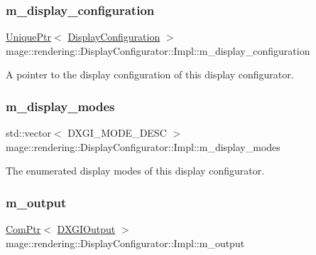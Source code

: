 \subsubsection{\texorpdfstring{m\+\_\+display\+\_\+configuration}{m\_display\_configuration}}
{\footnotesize\ttfamily \mbox{\hyperlink{namespacemage_a3316d7143a973e37adf1110f2e80ca31}{Unique\+Ptr}}$<$ \mbox{\hyperlink{classmage_1_1rendering_1_1_display_configuration}{Display\+Configuration}} $>$ mage\+::rendering\+::\+Display\+Configurator\+::\+Impl\+::m\+\_\+display\+\_\+configuration\hspace{0.3cm}{\ttfamily [private]}}

A pointer to the display configuration of this display configurator. \mbox{\label{classmage_1_1rendering_1_1_display_configurator_1_1_impl_ae04d4e1430c684cb0961f838d040f6e1}} 
\subsubsection{\texorpdfstring{m\+\_\+display\+\_\+modes}{m\_display\_modes}}
{\footnotesize\ttfamily std\+::vector$<$ D\+X\+G\+I\+\_\+\+M\+O\+D\+E\+\_\+\+D\+E\+SC $>$ mage\+::rendering\+::\+Display\+Configurator\+::\+Impl\+::m\+\_\+display\+\_\+modes\hspace{0.3cm}{\ttfamily [private]}}

The enumerated display modes of this display configurator. \mbox{\label{classmage_1_1rendering_1_1_display_configurator_1_1_impl_accf774307783109a1e885efc5ec19a90}} 
\subsubsection{\texorpdfstring{m\+\_\+output}{m\_output}}
{\footnotesize\ttfamily \mbox{\hyperlink{namespacemage_ae74f374780900893caa5555d1031fd79}{Com\+Ptr}}$<$ \mbox{\hyperlink{namespacemage_1_1rendering_aaf22d3893277a4bd8497f6ea69b01532}{D\+X\+G\+I\+Output}} $>$ mage\+::rendering\+::\+Display\+Configurator\+::\+Impl\+::m\+\_\+output\hspace{0.3cm}{\ttfamily [private]}}

